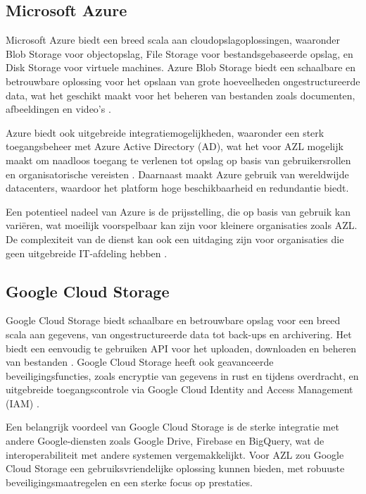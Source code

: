 \subsection{Microsoft Azure}
Microsoft Azure biedt een breed scala aan cloudopslagoplossingen, waaronder Blob Storage voor objectopslag, File Storage voor bestandsgebaseerde opslag, en Disk Storage voor virtuele machines. Azure Blob Storage biedt een schaalbare en betrouwbare oplossing voor het opslaan van grote hoeveelheden ongestructureerde data, wat het geschikt maakt voor het beheren van bestanden zoals documenten, afbeeldingen en video's \autocite{azure_blob}.

Azure biedt ook uitgebreide integratiemogelijkheden, waaronder een sterk toegangsbeheer met Azure Active Directory (AD), wat het voor AZL mogelijk maakt om naadloos toegang te verlenen tot opslag op basis van gebruikersrollen en organisatorische vereisten \autocite{azure_ad}. Daarnaast maakt Azure gebruik van wereldwijde datacenters, waardoor het platform hoge beschikbaarheid en redundantie biedt.

Een potentieel nadeel van Azure is de prijsstelling, die op basis van gebruik kan variëren, wat moeilijk voorspelbaar kan zijn voor kleinere organisaties zoals AZL. De complexiteit van de dienst kan ook een uitdaging zijn voor organisaties die geen uitgebreide IT-afdeling hebben \autocite{azure_pricing}.

\subsection{Google Cloud Storage}
Google Cloud Storage biedt schaalbare en betrouwbare opslag voor een breed scala aan gegevens, van ongestructureerde data tot back-ups en archivering. Het biedt een eenvoudig te gebruiken API voor het uploaden, downloaden en beheren van bestanden \autocite{google_storage}. Google Cloud Storage heeft ook geavanceerde beveiligingsfuncties, zoals encryptie van gegevens in rust en tijdens overdracht, en uitgebreide toegangscontrole via Google Cloud Identity and Access Management (IAM) \autocite{google_iam}.

Een belangrijk voordeel van Google Cloud Storage is de sterke integratie met andere Google-diensten zoals Google Drive, Firebase en BigQuery, wat de interoperabiliteit met andere systemen vergemakkelijkt. Voor AZL zou Google Cloud Storage een gebruiksvriendelijke oplossing kunnen bieden, met robuuste beveiligingsmaatregelen en een sterke focus op prestaties.

